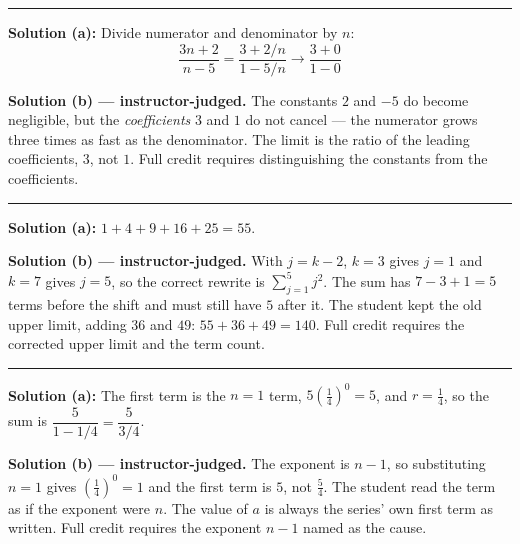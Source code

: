 \documentclass[12pt]{article}
\begin{document}
\vspace{0.15cm}\noindent\rule{\linewidth}{0.2pt}\vspace{0.15cm}


\textbf{Solution (a):} \quad Divide numerator and denominator by $n$:
\[ \frac{3n+2}{n-5} = \frac{3 + 2/n}{1 - 5/n} \longrightarrow \frac{3 + 0}{1 - 0} \]

\textbf{Solution (b) --- instructor-judged.} \quad The constants $2$ and $-5$ do become
negligible, but the \emph{coefficients} $3$ and $1$ do not cancel --- the numerator grows three
times as fast as the denominator. The limit is the ratio of the leading coefficients, $3$, not
$1$. Full credit requires distinguishing the constants from the coefficients.

\vspace{0.15cm}\noindent\rule{\linewidth}{0.2pt}\vspace{0.15cm}


\textbf{Solution (a):} \quad $1 + 4 + 9 + 16 + 25 = 55$. 

\textbf{Solution (b) --- instructor-judged.} \quad With $j = k - 2$, $k = 3$ gives $j = 1$ and
$k = 7$ gives $j = 5$, so the correct rewrite is $\sum_{j=1}^{5} j^2$. The sum has
$7 - 3 + 1 = 5$ terms before the shift and must still have $5$ after it. The student kept the
old upper limit, adding $36$ and $49$: $55 + 36 + 49 = 140$. Full credit requires the corrected
upper limit and the term count.

\vspace{0.15cm}\noindent\rule{\linewidth}{0.2pt}\vspace{0.15cm}


\textbf{Solution (a):} \quad The first term is the $n=1$ term,
$5\left(\frac{1}{4}\right)^{0} = 5$, and $r = \frac{1}{4}$, so the sum is
$\dfrac{5}{1 - 1/4} = \dfrac{5}{3/4}$. 

\textbf{Solution (b) --- instructor-judged.} \quad The exponent is $n-1$, so substituting
$n = 1$ gives $\left(\frac{1}{4}\right)^0 = 1$ and the first term is $5$, not $\frac{5}{4}$.
The student read the term as if the exponent were $n$. The value of $a$ is always the series'
own first term as written. Full credit requires the exponent $n-1$ named as the cause.
\end{document}
